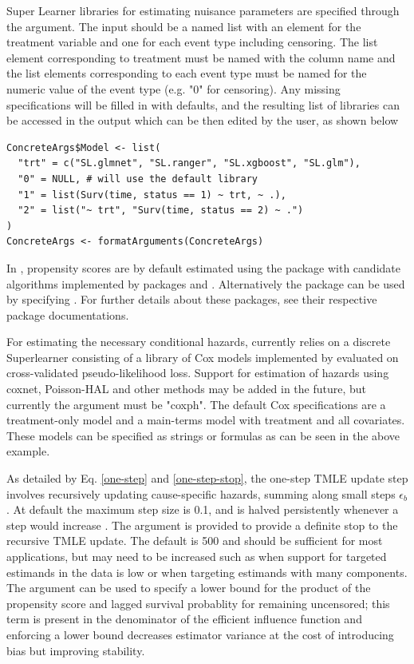 \documentclass{report}
\newcommand{\1}{\ensuremath{\mathbf{1}}}
\begin{document}
Super Learner libraries for estimating nuisance parameters are specified through the  argument. The input should be a named list with an element for the treatment variable and one for each event type including censoring. The list element corresponding to treatment must be named with the column name and the list elements corresponding to each event type must be named for the numeric value of the event type (e.g. "0" for censoring). Any missing specifications will be filled in with defaults, and the resulting list of libraries can be accessed in the output  which can be then edited by the user, as shown below

\begin{lstlisting}
ConcreteArgs$Model <- list(
  "trt" = c("SL.glmnet", "SL.ranger", "SL.xgboost", "SL.glm"),
  "0" = NULL, # will use the default library
  "1" = list(Surv(time, status == 1) ~ trt, ~ .),
  "2" = list("~ trt", "Surv(time, status == 2) ~ .")
)
ConcreteArgs <- formatArguments(ConcreteArgs)
\end{lstlisting}

In , propensity scores are by default estimated using the  package  with candidate algorithms  implemented by packages  and . Alternatively the  package can be used by specifying . For further details about these packages, see their respective package documentations.

For estimating the necessary conditional hazards,  currently relies on a discrete Superlearner consisting of a library of Cox models implemented by  evaluated on cross-validated pseudo-likelihood loss. Support for estimation of hazards using coxnet, Poisson-HAL and other methods may be added in the future, but currently the  argument must be "coxph". The default Cox specifications are a treatment-only model and a main-terms model with treatment and all covariates. These models can be specified as strings or formulas as can be seen in the above example.

As detailed by Eq. \eqref{one-step} and \eqref{one-step-stop}, the one-step TMLE update step involves recursively updating cause-specific hazards, summing along small steps \(\epsilon_b\). At default the maximum step size is 0.1, and is halved persistently whenever a step would increase . 
The  argument is provided to provide a definite stop to the recursive TMLE update. The default is 500 and should be sufficient for most applications, but may need to be increased such as when support for targeted estimands in the data is low or when targeting estimands with many components.
The argument  can be used to specify a lower bound for the product of the propensity score and lagged survival probablity for remaining uncensored; this term is present in the denominator of the efficient influence function and enforcing a lower bound decreases estimator variance at the cost of introducing bias but improving stability.
\end{document}
